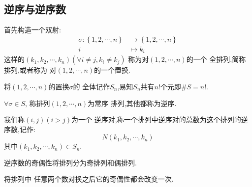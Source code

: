 \subsection{逆序与逆序数}
\begin{formal}
\begin{definition}[置换]\label{def:置换}
首先构造一个双射:
\begin{align*}
    \sigma :  \left\{1,2,\cdots,n\right\} 
    & \longrightarrow 
    \left\{1,2,\cdots,n\right\} \\
    i & \longmapsto k_i    
\end{align*}
这样的$\left(k_1,k_2,\cdots,k_n\right)\left(
    \forall i \neq j,k_i \neq k_j
\right)$
称为对$\left(1,2,\cdots,n\right)$的一个
全排列,简称排列,或者称为
对$\left(1,2,\cdots,n\right)$的一个置换.
\end{definition}
\end{formal}
\begin{green}
\begin{corollary}[置换全体]\label{cor:置换全体}
    将$\left(1,2,\cdots,n\right)$的置换$\sigma$的
全体记作$S_n$,易知$S_n$共有$n!$个元即$\#S=n!$.
\end{corollary}
\end{green}
\begin{formal}
\begin{definition}[逆序与常序]\label{def:逆序与常序}
    $\forall \sigma\in S$,
    称排列$\left(1,2,\cdots,n\right)$为常序
排列,其他都称为逆序.
\end{definition}
\end{formal}
\begin{formal}
    \begin{definition}[逆序数]\label{def:逆序数}
我们称$\left(i,j\right)\left(i > j\right)$为一个
逆序对,称一个排列中逆序对的总数为这个排列的逆序数,记作:
\[
N\left(k_1,k_2,\cdots,k_n\right)
\]
其中$\left(k_1,k_2,\cdots,k_n\right) \in S_n.$
\end{definition}
\end{formal}
\begin{formal}\begin{definition}[排列的奇偶性]\label{def:排列的奇偶性}
逆序数的奇偶性将排列分为奇排列和偶排列.
\end{definition}
\end{formal}
\begin{formal}
    \begin{proposition}[对换]\label{prop:对换}
将排列中
任意两个数对换之后它的奇偶性都会改变一次.
\end{proposition}
\end{formal}
